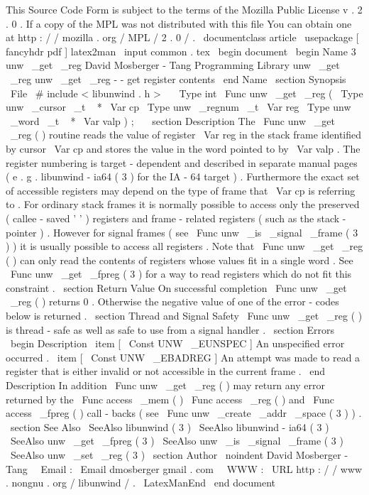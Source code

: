 %
This
Source
Code
Form
is
subject
to
the
terms
of
the
Mozilla
Public
%
License
v
.
2
.
0
.
If
a
copy
of
the
MPL
was
not
distributed
with
this
%
file
You
can
obtain
one
at
http
:
/
/
mozilla
.
org
/
MPL
/
2
.
0
/
.
\
documentclass
{
article
}
\
usepackage
[
fancyhdr
pdf
]
{
latex2man
}
\
input
{
common
.
tex
}
\
begin
{
document
}
\
begin
{
Name
}
{
3
}
{
unw
\
_get
\
_reg
}
{
David
Mosberger
-
Tang
}
{
Programming
Library
}
{
unw
\
_get
\
_reg
}
unw
\
_get
\
_reg
-
-
get
register
contents
\
end
{
Name
}
\
section
{
Synopsis
}
\
File
{
\
#
include
<
libunwind
.
h
>
}
\
\
\
Type
{
int
}
\
Func
{
unw
\
_get
\
_reg
}
(
\
Type
{
unw
\
_cursor
\
_t
~
*
}
\
Var
{
cp
}
\
Type
{
unw
\
_regnum
\
_t
}
\
Var
{
reg
}
\
Type
{
unw
\
_word
\
_t
~
*
}
\
Var
{
valp
}
)
;
\
\
\
section
{
Description
}
The
\
Func
{
unw
\
_get
\
_reg
}
(
)
routine
reads
the
value
of
register
\
Var
{
reg
}
in
the
stack
frame
identified
by
cursor
\
Var
{
cp
}
and
stores
the
value
in
the
word
pointed
to
by
\
Var
{
valp
}
.
The
register
numbering
is
target
-
dependent
and
described
in
separate
manual
pages
(
e
.
g
.
libunwind
-
ia64
(
3
)
for
the
IA
-
64
target
)
.
Furthermore
the
exact
set
of
accessible
registers
may
depend
on
the
type
of
frame
that
\
Var
{
cp
}
is
referring
to
.
For
ordinary
stack
frames
it
is
normally
possible
to
access
only
the
preserved
(
callee
-
saved
'
'
)
registers
and
frame
-
related
registers
(
such
as
the
stack
-
pointer
)
.
However
for
signal
frames
(
see
\
Func
{
unw
\
_is
\
_signal
\
_frame
}
(
3
)
)
it
is
usually
possible
to
access
all
registers
.
Note
that
\
Func
{
unw
\
_get
\
_reg
}
(
)
can
only
read
the
contents
of
registers
whose
values
fit
in
a
single
word
.
See
\
Func
{
unw
\
_get
\
_fpreg
}
(
3
)
for
a
way
to
read
registers
which
do
not
fit
this
constraint
.
\
section
{
Return
Value
}
On
successful
completion
\
Func
{
unw
\
_get
\
_reg
}
(
)
returns
0
.
Otherwise
the
negative
value
of
one
of
the
error
-
codes
below
is
returned
.
\
section
{
Thread
and
Signal
Safety
}
\
Func
{
unw
\
_get
\
_reg
}
(
)
is
thread
-
safe
as
well
as
safe
to
use
from
a
signal
handler
.
\
section
{
Errors
}
\
begin
{
Description
}
\
item
[
\
Const
{
UNW
\
_EUNSPEC
}
]
An
unspecified
error
occurred
.
\
item
[
\
Const
{
UNW
\
_EBADREG
}
]
An
attempt
was
made
to
read
a
register
that
is
either
invalid
or
not
accessible
in
the
current
frame
.
\
end
{
Description
}
In
addition
\
Func
{
unw
\
_get
\
_reg
}
(
)
may
return
any
error
returned
by
the
\
Func
{
access
\
_mem
}
(
)
\
Func
{
access
\
_reg
}
(
)
and
\
Func
{
access
\
_fpreg
}
(
)
call
-
backs
(
see
\
Func
{
unw
\
_create
\
_addr
\
_space
}
(
3
)
)
.
\
section
{
See
Also
}
\
SeeAlso
{
libunwind
(
3
)
}
\
SeeAlso
{
libunwind
-
ia64
(
3
)
}
\
SeeAlso
{
unw
\
_get
\
_fpreg
(
3
)
}
\
SeeAlso
{
unw
\
_is
\
_signal
\
_frame
(
3
)
}
\
SeeAlso
{
unw
\
_set
\
_reg
(
3
)
}
\
section
{
Author
}
\
noindent
David
Mosberger
-
Tang
\
\
Email
:
\
Email
{
dmosberger
gmail
.
com
}
\
\
WWW
:
\
URL
{
http
:
/
/
www
.
nongnu
.
org
/
libunwind
/
}
.
\
LatexManEnd
\
end
{
document
}
